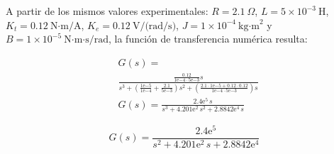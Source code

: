 A partir de los mismos valores experimentales: $R = 2.1\ \Omega$, $L = 5\times10^{-3}\ \text{H}$, $K_t = 0.12\ \text{N·m/A}$, $K_e = 0.12\ \text{V/(rad/s)}$, $J = 1\times10^{-4}\ \text{kg·m}^2$ y $B = 1\times10^{-5}\ \text{N·m·s/rad}$, la función de transferencia numérica resulta:

\begin{equation*}
  \begin{aligned}
    &G(s) =\\
    &\frac{\tfrac{0.12}{1\mathrm{e}{-4} \cdot 5\mathrm{e}{-3}}s}{s^{3} + \left(\tfrac{1\mathrm{e}{-5}}{1\mathrm{e}{-4}} + \tfrac{2.1}{5\mathrm{e}{-3}}\right)s^{2} + \left(\tfrac{2.1\cdot1\mathrm{e}{-5} + 0.12\cdot0.12}{1\mathrm{e}{-4} \cdot 5\mathrm{e}{-3}}\right)s}\\
    &G(s) =
    \frac{2.4\mathrm{e}^{5}\,s}{s^{3} + 4.201\mathrm{e}^{2}\,s^{2} + 2.8842\mathrm{e}^{4}\,s} 
  \end{aligned}
\end{equation*}

\begin{equation}
G(s) = \frac{2.4\mathrm{e}^{5}}{s^{2} + 4.201\mathrm{e}^{2}\,s + 2.8842\mathrm{e}^{4}}
\label{eq:TransferFunctionNumeric}
\end{equation}
